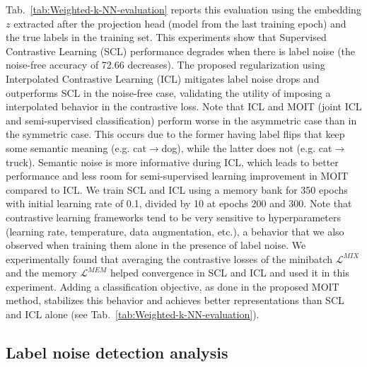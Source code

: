 \documentclass[final]{cvpr}
\begin{document}
Tab.~\ref{tab:Weighted-k-NN-evaluation} reports this evaluation using the embedding $z$ extracted after the projection head (model from the last training epoch) and the true labels in the training set. This experiments show that Supervised Contrastive Learning (SCL) \cite{2020_arXiv_SupContLearn} performance degrades when there is label noise (the noise-free accuracy of 72.66 decreases). The proposed regularization using Interpolated Contrastive Learning (ICL) mitigates label noise drops and outperforms SCL in the noise-free case, validating the utility of imposing a interpolated behavior in the contrastive loss. Note that ICL and MOIT (joint ICL and semi-supervised classification) perform worse in the asymmetric case than in the symmetric case. This occurs due to the former having label flips that keep some semantic meaning (e.g. cat$\rightarrow$dog), while the latter does not (e.g. cat$\rightarrow$truck). Semantic noise is more informative during ICL, which leads to better performance and less room for semi-supervised learning improvement in MOIT compared to ICL.
We train SCL and ICL using a memory bank for 350 epochs with initial learning rate of 0.1, divided by 10 at epochs 200 and 300. Note that contrastive
learning frameworks tend to be very sensitive to hyperparameters \cite{2020_ICML_SimCLR,2020_CVPR_MoCo,2020_arXiv_SupContLearn}
(learning rate, temperature, data augmentation, etc.), a behavior that we also observed when training them alone in the presence of label noise. We experimentally found that averaging the contrastive losses of the minibatch $\mathcal{L}^{\mathit{MIX}}$ and the memory $\mathcal{L}^{\mathit{MEM}}$ helped convergence in SCL and ICL and used it in this experiment. Adding a classification objective, as done in the proposed MOIT method, stabilizes this behavior and achieves better representations than SCL and ICL alone (see Tab.~\ref{tab:Weighted-k-NN-evaluation}).

\subsection{Label noise detection analysis\label{subsec:Joint-training-hyperparameters}}
\end{document}
